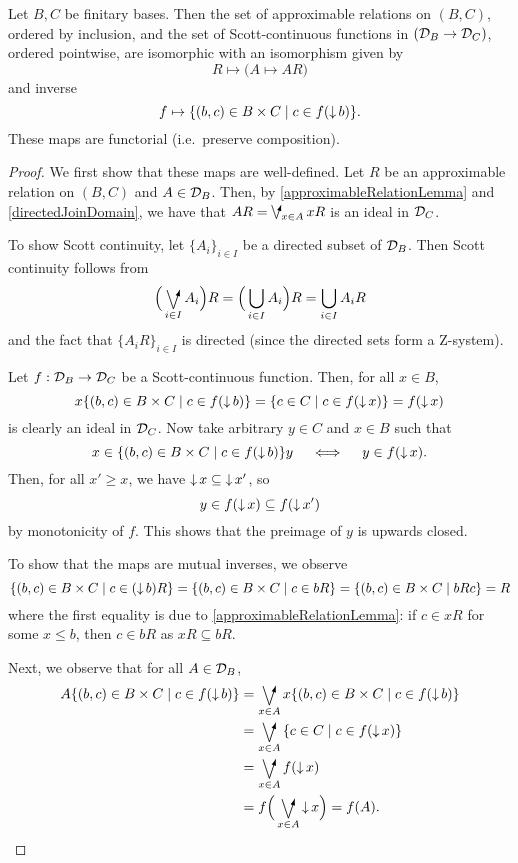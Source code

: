\begin{proposition}
Let $B,C$ be finitary bases. Then the set of approximable relations on $(B,C)$, ordered by inclusion, and the set of Scott-continuous functions in $(\mathcal{D}_B \to \mathcal{D}_C)$, ordered pointwise, are isomorphic with an isomorphism given by
\[ R\mapsto \big(A\mapsto AR\big) \]
and inverse
\[ f \mapsto \setbuilder{(b,c)\in B\times C}{c \in f(\downset b)}. \]
These maps are functorial (i.e.\ preserve composition).
\end{proposition}
\begin{proof}
We first show that these maps are well-defined. Let $R$ be an approximable relation on $(B,C)$ and $A\in\mathcal{D}_B$. Then, by \ref{approximableRelationLemma} and \ref{directedJoinDomain}, we have that $AR = \dirvee_{x\in A}xR$ is an ideal in $\mathcal{D}_C$.

To show Scott continuity, let $\{A_i\}_{i\in I}$ be a directed subset of $\mathcal{D}_B$. Then Scott continuity follows from
\[ \Big(\dirvee_{i\in I}A_i\Big)R = \Big(\bigcup_{i\in I}A_i\Big)R = \bigcup_{i\in I}A_iR \]
and the fact that $\{A_iR\}_{i\in I}$ is directed (since the directed sets form a $\mathrm{Z}$-system).

Let $f: \mathcal{D}_B\to\mathcal{D}_C$ be a Scott-continuous function. Then, for all $x\in B$,
\[ x\setbuilder{(b,c)\in B\times C}{c \in f(\downset b)} = \setbuilder{c\in C}{c\in f(\downset x)} = f(\downset x) \]
is clearly an ideal in $\mathcal{D}_C$.
Now take arbitrary $y\in C$ and $x\in B$ such that
\[ x \in \setbuilder{(b,c)\in B\times C}{c \in f(\downset b)}y \quad \iff\quad y\in f(\downset x). \]
Then, for all $x'\geq x$, we have $\operatorname{\downarrow} x \subseteq \operatorname{\downarrow} x'$, so
\[ y\in f(\operatorname{\downarrow} x) \subseteq f(\operatorname{\downarrow} x') \]
by monotonicity of $f$. This shows that the preimage of $y$ is upwards closed.

To show that the maps are mutual inverses, we observe
\[ \setbuilder{(b,c)\in B\times C}{c \in (\downset b)R} = \setbuilder{(b,c)\in B\times C}{c \in bR} = \setbuilder{(b,c)\in B\times C}{bRc} = R \]
where the first equality is due to \ref{approximableRelationLemma}: if $c\in xR$ for some $x\leq b$, then $c\in bR$ as $xR\subseteq bR$.

Next, we observe that for all $A\in \mathcal{D}_B$,
\begin{align*}
A\setbuilder{(b,c)\in B\times C}{c \in f(\downset b)} &=\dirvee_{x\in A}x\setbuilder{(b,c)\in B\times C}{c \in f(\downset b)} \\
&= \dirvee_{x\in A}\setbuilder{c\in C}{c \in f(\downset x)} \\
&= \dirvee_{x\in A}f(\downset x) \\
&= f\Big(\dirvee_{x\in A}\downset x\Big) = f(A).
\end{align*}


\end{proof}
